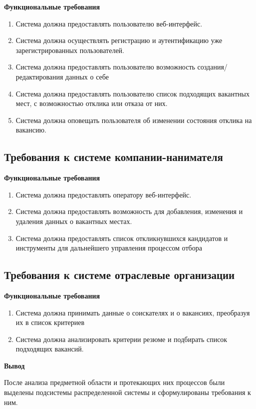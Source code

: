\textbf{Функциональные требования}
\begin{enumerate}
\item Система должна предоставлять пользователю веб-интерфейс.
\item Система должна осуществлять регистрацию и аутентификацию уже зарегистрированных пользователей.
\item Система должна предоставлять пользователю возможность создания/редактирования данных о себе
\item Система должна предоставлять пользователю список подходящих вакантных мест, с возможностью отклика или отказа от них.
\item Система должна оповещать пользователя об изменении состояния отклика на вакансию.
\end{enumerate}

\subsection{Требования к системе компании-нанимателя}
\textbf{Функциональные требования}
\begin{enumerate}
\item Система должна предоставлять оператору веб-интерфейс.
\item Система должна предоставлять возможность для добавления, изменения и удаления данных о вакантных местах.
\item Система должна предоставлять список откликнувшихся кандидатов и инструменты для дальнейшего управления процессом отбора
\end{enumerate}

\subsection{Требования к системе отраслевые организации}
\textbf{Функциональные требования}
\begin{enumerate}
\item Система должна принимать данные о соискателях и о вакансиях, преобразуя их в список критериев
\item Система должна анализировать критерии резюме и подбирать список подходящих вакансий.
\end{enumerate}

\textbf{Вывод}

После анализа предметной области и протекающих  них процессов были выделены подсистемы распределенной системы и сформулированы требования к ним.


